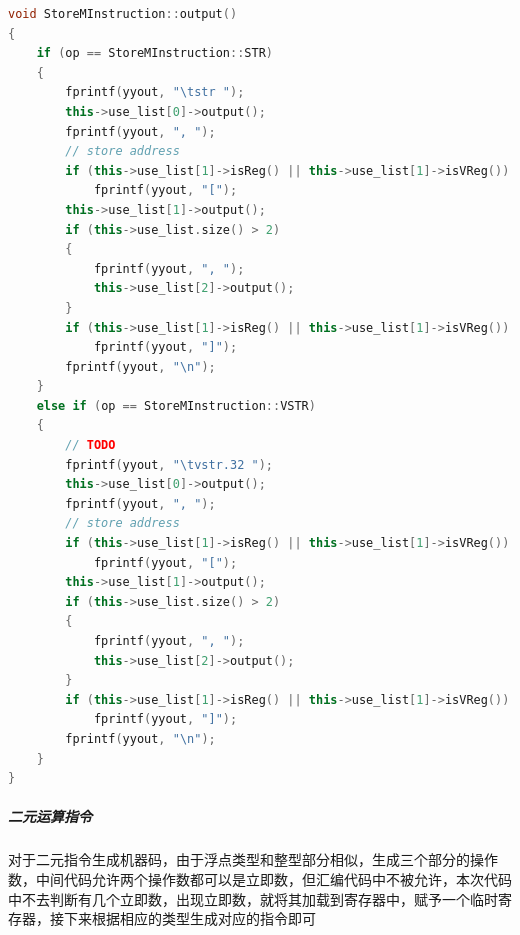 \documentclass[UTF8,a4paper,10pt]{ctexart}
\begin{document}
\begin{lstlisting}[title = 机器码翻译, language = c++]
void StoreMInstruction::output()
{
    if (op == StoreMInstruction::STR)
    {
        fprintf(yyout, "\tstr ");
        this->use_list[0]->output();
        fprintf(yyout, ", ");
        // store address
        if (this->use_list[1]->isReg() || this->use_list[1]->isVReg())
            fprintf(yyout, "[");
        this->use_list[1]->output();
        if (this->use_list.size() > 2)
        {
            fprintf(yyout, ", ");
            this->use_list[2]->output();
        }
        if (this->use_list[1]->isReg() || this->use_list[1]->isVReg())
            fprintf(yyout, "]");
        fprintf(yyout, "\n");
    }
    else if (op == StoreMInstruction::VSTR)
    {
        // TODO
        fprintf(yyout, "\tvstr.32 ");
        this->use_list[0]->output();
        fprintf(yyout, ", ");
        // store address
        if (this->use_list[1]->isReg() || this->use_list[1]->isVReg())
            fprintf(yyout, "[");
        this->use_list[1]->output();
        if (this->use_list.size() > 2)
        {
            fprintf(yyout, ", ");
            this->use_list[2]->output();
        }
        if (this->use_list[1]->isReg() || this->use_list[1]->isVReg())
            fprintf(yyout, "]");
        fprintf(yyout, "\n");
    }
}
\end{lstlisting}

\subparagraph{二元运算指令}
对于二元指令生成机器码，由于浮点类型和整型部分相似，生成三个部分的操作数，中间代码允许两个操作数都可以是立即数，但汇编代码中不被允许，本次代码中不去判断有几个立即数，出现立即数，就将其加载到寄存器中，赋予一个临时寄存器，接下来根据相应的类型生成对应的指令即可
\end{document}
